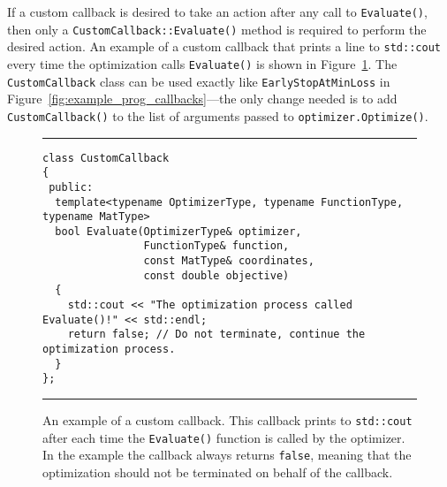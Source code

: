 If a custom callback is desired to take an action after any call
to {\tt Evaluate()}, then only a {\tt CustomCallback::Evaluate()} method is required
to perform the desired action.
An example of a custom callback that 
prints a line to {\tt std::cout} every time the optimization calls
{\tt Evaluate()} is shown in Figure~\ref{fig:example_prog_callbacks_2}.
The {\tt CustomCallback} class can be used exactly like {\tt EarlyStopAtMinLoss}
in Figure~\ref{fig:example_prog_callbacks}---the only change
needed is to add {\tt CustomCallback()} to the list of arguments passed to
{\tt optimizer.Optimize()}.


\begin{figure}[!b]
\centering
\hrule
\vspace{1ex}
\begin{verbatim}
class CustomCallback
{
 public:
  template<typename OptimizerType, typename FunctionType, typename MatType>
  bool Evaluate(OptimizerType& optimizer,
                FunctionType& function,
                const MatType& coordinates,
                const double objective)
  {
    std::cout << "The optimization process called Evaluate()!" << std::endl;
    return false; // Do not terminate, continue the optimization process.
  }
};
\end{verbatim}
\hrule
\vspace*{-0.5em}
\caption
  {
  An example of a custom callback.  This callback prints to {\tt std::cout}
after each time the {\tt Evaluate()} function is called by the optimizer. In the example the
callback always returns {\tt false}, meaning that the optimization should not be
terminated on behalf of the callback.
  }
\label{fig:example_prog_callbacks_2}
\end{figure}

